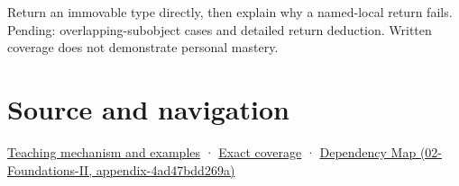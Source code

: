 Return an immovable type directly, then explain why a named-local return fails. Pending: overlapping-subobject cases and detailed return deduction. Written coverage does not demonstrate personal mastery.

\section{Source and navigation}\label{appendix-b08d3788c5c6-source-and-navigation}

\href{Continuous\%20Notes/Computing\%20Foundations\%20-\%20From\%20Bits\%20to\%20C++\%20and\%20Systems\%20APIs\#Return\%20a\%20result\%20without\%20handing\%20out\%20a\%20lifetime\%20problem}{Teaching mechanism and examples} · \hyperref[appendix-fd090d982a15-m009---parts-127-147]{Exact coverage} · \href{../02-Foundations-II/main.pdf\#nameddest=appendix-4ad47bdd269a}{Dependency Map (02-Foundations-II, appendix-4ad47bdd269a)}

